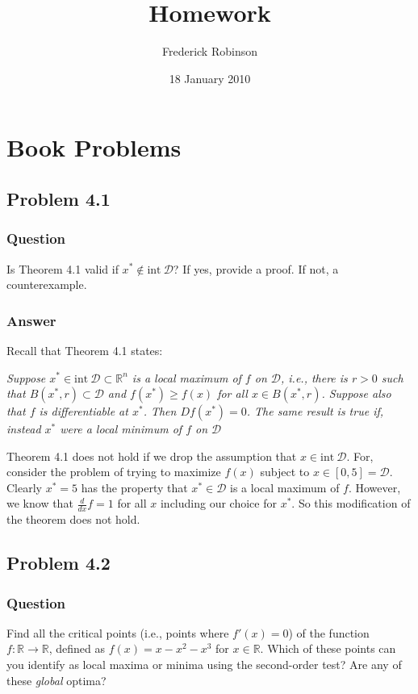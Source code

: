 \documentclass[12pt]{article}
\title{Homework}
\author{Frederick Robinson}
\date{18 January 2010}
\begin{document}

   \maketitle

\setcounter{tocdepth}{2} 

\tableofcontents

\section{Book Problems}

\subsection{Problem 4.1}
\subsubsection{Question}
Is Theorem 4.1 valid if $x^* \notin \mathrm{int}\  \mathcal{D}$? If yes, provide a proof. If not, a counterexample.
\subsubsection{Answer}
Recall that Theorem 4.1 states: 

\emph{Suppose $x^* \in \mathrm{int}\ \mathcal{D} \subset \mathbb{R}^n$ is a local maximum of $f$ on $\mathcal{D}$, i.e., there is $r>0$ such that $B(x^*,r) \subset \mathcal{D}$ and $f(x^*) \geq f(x)$  for all $x \in B(x^*,r)$. Suppose also that $f$ is differentiable at $x^*$. Then $Df(x^*)=0$. The same result is true if, instead $x^*$ were a local minimum of $f$ on $\mathcal{D}$}

Theorem 4.1 does not hold if we drop the assumption that $x \in \mathrm{int}\ \mathcal{D}$. For, consider the problem of trying to maximize $f(x)$ subject to $x \in [0,5]= \mathcal{D}$. Clearly $x^*=5$ has the property that $x^* \in \mathcal{D}$ is a local maximum of $f$. However, we know that $\frac{d}{dx} f = 1$ for all $x$ including our choice for $x^*$. So this modification of the theorem does not hold.




\subsection{Problem 4.2}
\subsubsection{Question}
Find all the critical points (i.e., points where $f'(x)=0$) of the function $f:\mathbb{R} \to \mathbb{R}$, defined as $f(x) = x-x^2-x^3$ for $ x \in \mathbb{R}$. Which of these points can you identify as local maxima or minima using the second-order test? Are any of these \emph{global} optima?
\end{document}
